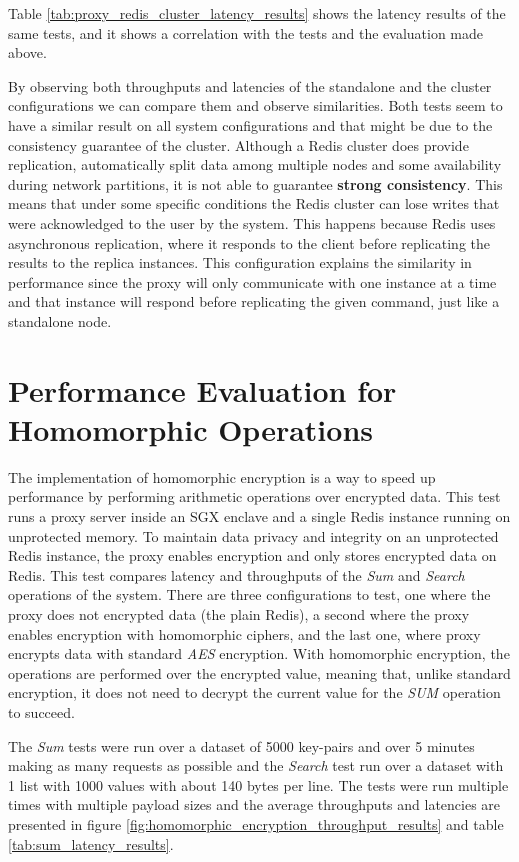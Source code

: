 Table \ref{tab:proxy_redis_cluster_latency_results} shows the latency results of the same tests, and it shows a correlation with the tests and the evaluation made above.

By observing both throughputs and latencies of the standalone and the cluster configurations we can compare them and observe similarities. Both tests seem to have a similar result on all system configurations and that might be due to the consistency guarantee of the cluster. Although a Redis cluster does provide replication, automatically split data among multiple nodes and some availability during network partitions, it is not able to guarantee \textbf{strong consistency}. This means that under some specific conditions the Redis cluster can lose writes that were acknowledged to the user by the system. This happens because Redis uses asynchronous replication, where it responds to the client before replicating the results to the replica instances. This configuration explains the similarity in performance since the proxy will only communicate with one instance at a time and that instance will respond before replicating the given command, just like a standalone node.

\section{Performance Evaluation for Homomorphic Operations}
\label{sec:performance_evaluation_homomorphic_operations}

The implementation of homomorphic encryption is a way to speed up performance by performing arithmetic operations over encrypted data. This test runs a proxy server inside an \gls{SGX} enclave and a single Redis instance running on unprotected memory. To maintain data privacy and integrity on an unprotected Redis instance, the proxy enables encryption and only stores encrypted data on Redis. This test compares latency and throughputs of the \textit{Sum} and \textit{Search} operations of the system. There are three configurations to test, one where the proxy does not encrypted data (the plain Redis), a second where the proxy enables encryption with homomorphic ciphers, and the last one, where proxy encrypts data with standard \textit{AES} encryption. With homomorphic encryption, the operations are performed over the encrypted value, meaning that, unlike standard encryption, it does not need to decrypt the current value for the \textit{SUM} operation to succeed.

The \textit{Sum} tests were run over a dataset of 5000 key-pairs and over 5 minutes making as many requests as possible and the \textit{Search} test run over a dataset with 1 list with 1000 values with about 140 bytes per line. The tests were run multiple times with multiple payload sizes and the average throughputs and latencies are presented in figure \ref{fig:homomorphic_encryption_throughput_results} and table \ref{tab:sum_latency_results}.


